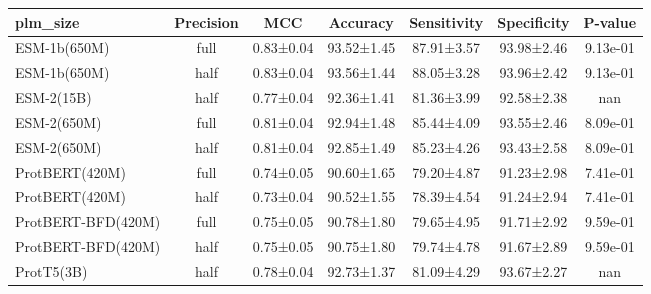 \begin{tabular}{lcccccc}
\toprule
          plm_size & Precision &       MCC &   Accuracy & Sensitivity & Specificity &  P-value \\
\midrule
      ESM-1b(650M) &      full & 0.83±0.04 & 93.52±1.45 &  87.91±3.57 &  93.98±2.46 & 9.13e-01 \\
      ESM-1b(650M) &      half & 0.83±0.04 & 93.56±1.44 &  88.05±3.28 &  93.96±2.42 & 9.13e-01 \\
        ESM-2(15B) &      half & 0.77±0.04 & 92.36±1.41 &  81.36±3.99 &  92.58±2.38 &      nan \\
       ESM-2(650M) &      full & 0.81±0.04 & 92.94±1.48 &  85.44±4.09 &  93.55±2.46 & 8.09e-01 \\
       ESM-2(650M) &      half & 0.81±0.04 & 92.85±1.49 &  85.23±4.26 &  93.43±2.58 & 8.09e-01 \\
    ProtBERT(420M) &      full & 0.74±0.05 & 90.60±1.65 &  79.20±4.87 &  91.23±2.98 & 7.41e-01 \\
    ProtBERT(420M) &      half & 0.73±0.04 & 90.52±1.55 &  78.39±4.54 &  91.24±2.94 & 7.41e-01 \\
ProtBERT-BFD(420M) &      full & 0.75±0.05 & 90.78±1.80 &  79.65±4.95 &  91.71±2.92 & 9.59e-01 \\
ProtBERT-BFD(420M) &      half & 0.75±0.05 & 90.75±1.80 &  79.74±4.78 &  91.67±2.89 & 9.59e-01 \\
        ProtT5(3B) &      half & 0.78±0.04 & 92.73±1.37 &  81.09±4.29 &  93.67±2.27 &      nan \\
\bottomrule
\end{tabular}
